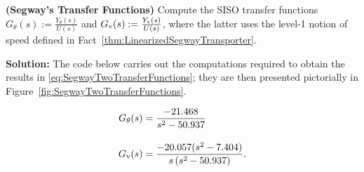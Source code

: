\vspace*{.5cm}

\begin{example}\textbf{(Segway's Transfer Functions)}
\label{ex:SegwayTwoTransferFunctions}
Compute the SISO transfer functions $G_\theta(s):= \frac{Y_{\theta}(s)}{U(s)}$ and $G_{\rm v}(s):= \frac{Y_{\rm v}(s)}{U(s)}$, where the latter uses the level-1 notion of speed defined in Fact~\ref{thm:LinearizedSegwayTransporter}. 
    
\end{example}
\textbf{Solution:} \quad \Ans \quad  The code below carries out the computations required to obtain the results in \eqref{eq:SegwayTwoTransferFunctions}; they are then presented pictorially in Figure~\ref{fig:SegwayTwoTransferFunctions}.

\begin{equation}
\label{eq:SegwayTwoTransferFunctions}
    \begin{aligned}
        G_\theta(s) &= \frac{-21.468}{s^2 - 50.937 } \\[1em]         
    G_{\rm v}(s) &= \frac{-20.057 (s^2 -7.404)}{s \left(s^2  - 50.937 \right)}. %
    \end{aligned}
\end{equation}

 

\vspace*{.cm}

